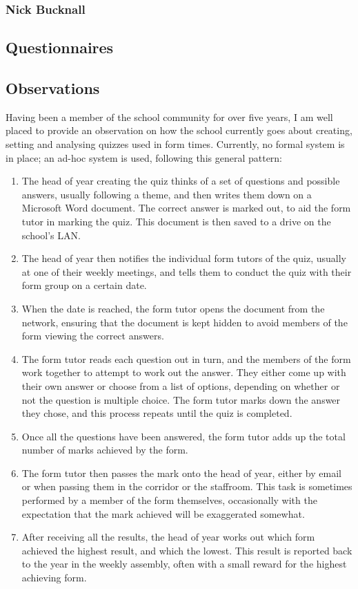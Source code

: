 \subsubsection{Nick Bucknall}

\subsection{Questionnaires}

\subsection{Observations}
Having been a member of the school community for over five years, I am well placed to provide an observation on how the school currently goes about creating, setting and analysing quizzes used in form times. Currently, no formal system is in place; an ad-hoc system is used, following this general pattern:

\begin{enumerate}
\item The head of year creating the quiz thinks of a set of questions and possible answers, usually following a theme, and then writes them down on a Microsoft Word document. The correct answer is marked out, to aid the form tutor in marking the quiz. This document is then saved to a drive on the school's LAN.

\item The head of year then notifies the individual form tutors of the quiz, usually at one of their weekly meetings, and tells them to conduct the quiz with their form group on a certain date.

\item When the date is reached, the form tutor opens the document from the network, ensuring that the document is kept hidden to avoid members of the form viewing the correct answers.

\item The form tutor reads each question out in turn, and the members of the form work together to attempt to work out the answer. They either come up with their own answer or choose from a list of options, depending on whether or not the question is multiple choice. The form tutor marks down the answer they chose, and this process repeats until the quiz is completed.

\item Once all the questions have been answered, the form tutor adds up the total number of marks achieved by the form.

\item The form tutor then passes the mark onto the head of year, either by email or when passing them in the corridor or the staffroom. This task is sometimes performed by a member of the form themselves, occasionally with the expectation that the mark achieved will be exaggerated somewhat.

\item After receiving all the results, the head of year works out which form achieved the highest result, and which the lowest. This result is reported back to the year in the weekly assembly, often with a small reward for the highest achieving form.
\end{enumerate}

